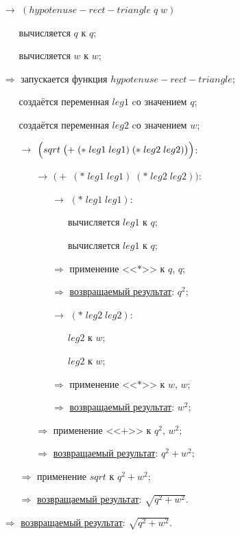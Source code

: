 \begin{itemize}
	\item[$\longrightarrow$] $(hypotenuse\!-\!rect\!-\!triangle\; q\; w)$
	\begin{itemize}
		\item[\textbullet] вычисляется $q$ к $q$;
		\item[\textbullet] вычисляется $w$ к $w$;
	\end{itemize}
	\item[$\Longrightarrow$] запускается функция $hypotenuse\!-\!rect\!-\!triangle$;
	\begin{itemize}
		\item[\textbullet] создаётся переменная $leg1$ cо значением $q$;
		\item[\textbullet] создаётся переменная $leg2$ cо значением $w$;
		\item[$\longrightarrow$] $\Bigl(sqrt\; \bigl(+\; (*\; leg1\; leg1)\; (*\; leg2\; leg2)\bigr)\Bigr)$:
		\begin{itemize}
			\item[$\longrightarrow$] $\bigl(+\; (*\; leg1\; leg1)\; (*\; leg2\; leg2)\bigr)$:
			\begin{enumerate}
				\item[$\longrightarrow$] $(*\; leg1\; leg1)$:
				\begin{enumerate}
					\item[\textbullet] вычисляется $leg1$ к $q$;
					\item[\textbullet] вычисляется $leg1$ к $q$;
				\end{enumerate}
				\item[$\Longrightarrow$] применение <<$*$>> к $q$, $q$;
				\item[$\Longrightarrow$] \underline{возвращаемый результат}: $q^2$;
				\item[$\longrightarrow$] $(*\; leg2\; leg2)$:
				\begin{enumerate}
					\item[\textbullet] $leg2$ к $w$;
					\item[\textbullet] $leg2$ к $w$;
				\end{enumerate}
				\item[$\Longrightarrow$] применение <<$*$>> к $w$, $w$;
				\item[$\Longrightarrow$] \underline{возвращаемый результат}: $w^2$;
			\end{enumerate}
			\item[$\Longrightarrow$] применение <<$+$>> к $q^2$, $w^2$;
			\item[$\Longrightarrow$] \underline{возвращаемый результат}: $q^2 + w^2$;
		\end{itemize}
		\item[$\Longrightarrow$] применение $sqrt$ к $q^2 + w^2$;
		\item[$\Longrightarrow$] \underline{возвращаемый результат}: $\sqrt{q^2 + w^2}$.
	\end{itemize}
	\item[$\Longrightarrow$] \underline{возвращаемый результат}: $\sqrt{q^2 + w^2}$.
\end{itemize}


